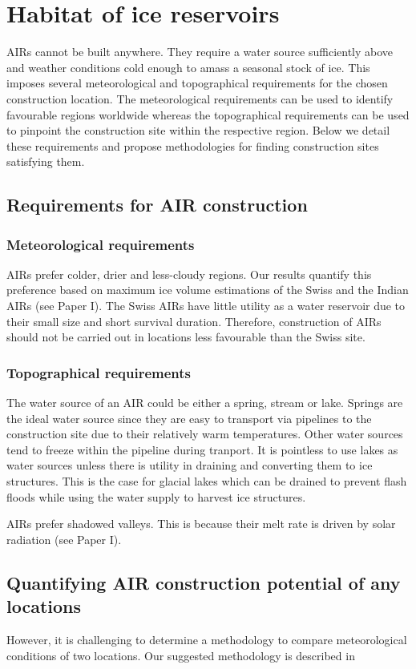 \chapter{Habitat of ice reservoirs}

AIRs cannot be built anywhere. They require a water source sufficiently above and weather conditions cold enough
to amass a seasonal stock of ice. This imposes several meteorological and topographical  requirements for the
chosen construction location. The meteorological requirements can be used to identify favourable regions
worldwide whereas the topographical requirements can be used to pinpoint the construction site within the
respective region. Below we detail these requirements and propose methodologies for finding construction sites
satisfying them. 

\section{Requirements for AIR construction}

\subsection{Meteorological requirements}

AIRs prefer colder, drier and less-cloudy regions. Our results quantify this preference based on maximum ice
volume estimations of the Swiss and the Indian AIRs (see Paper I). The Swiss AIRs have little utility as a water
reservoir due to their small size and short survival duration. Therefore, construction of AIRs should not be
carried out in locations less favourable than the Swiss site. 


\subsection{Topographical requirements}

The water source of an AIR could be either a spring, stream or lake. Springs are the ideal water source since
they are easy to transport via pipelines to the construction site due to their relatively warm temperatures.
Other water sources tend to freeze within the pipeline during tranport. It is pointless to use lakes as water
sources unless there is utility in draining and converting them to ice structures. This is the case for glacial
lakes which can be drained to prevent flash floods while using the water supply to harvest ice structures.

AIRs prefer shadowed valleys. This is because their melt rate is driven by solar radiation (see Paper I).

\section{Quantifying AIR construction potential of any locations}

However, it is challenging to determine a methodology to compare meteorological conditions of two locations. Our
suggested methodology is described in

